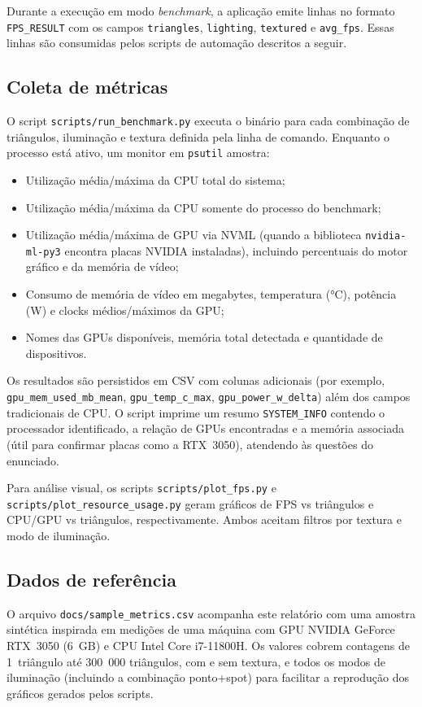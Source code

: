 \documentclass[11pt,a4paper]{article}
\begin{document}
Durante a execução em modo \emph{benchmark}, a aplicação emite linhas no formato
\texttt{FPS\_RESULT} com os campos \texttt{triangles}, \texttt{lighting},
\texttt{textured} e \texttt{avg\_fps}. Essas linhas são consumidas pelos
scripts de automação descritos a seguir.

\subsection{Coleta de métricas}
O script \texttt{scripts/run\_benchmark.py} executa o binário para cada
combinação de triângulos, iluminação e textura definida pela linha de comando.
Enquanto o processo está ativo, um monitor em \texttt{psutil} amostra:

\begin{itemize}
  \item Utilização média/máxima da CPU total do sistema;
  \item Utilização média/máxima da CPU somente do processo do benchmark;
  \item Utilização média/máxima de GPU via NVML (quando a biblioteca
        \texttt{nvidia-ml-py3} encontra placas NVIDIA instaladas), incluindo
        percentuais do motor gráfico e da memória de vídeo;
  \item Consumo de memória de vídeo em megabytes, temperatura (\si{\celsius}),
        potência (\si{\watt}) e clocks médios/máximos da GPU;
  \item Nomes das GPUs disponíveis, memória total detectada e quantidade de
        dispositivos.
\end{itemize}

Os resultados são persistidos em CSV com colunas adicionais (por exemplo,
\texttt{gpu\_mem\_used\_mb\_mean}, \texttt{gpu\_temp\_c\_max},
\texttt{gpu\_power\_w\_delta}) além dos campos tradicionais de CPU. O script
imprime um resumo \texttt{SYSTEM\_INFO} contendo o processador identificado, a
relação de GPUs encontradas e a memória associada (útil para confirmar placas
como a RTX~3050), atendendo às questões do enunciado.

Para análise visual, os scripts \texttt{scripts/plot\_fps.py} e
\texttt{scripts/plot\_resource\_usage.py} geram gráficos de FPS vs triângulos e
CPU/GPU vs triângulos, respectivamente. Ambos aceitam filtros por textura e
modo de iluminação.

\subsection{Dados de referência}
O arquivo \texttt{docs/sample\_metrics.csv} acompanha este relatório com uma
amostra sintética inspirada em medições de uma máquina com GPU NVIDIA GeForce
RTX~3050 (6~GB) e CPU Intel Core i7-11800H. Os valores cobrem contagens de
1~triângulo até 300~000 triângulos, com e sem textura, e todos os modos de
iluminação (incluindo a combinação ponto+spot) para facilitar a reprodução dos
gráficos gerados pelos scripts.
\end{document}
